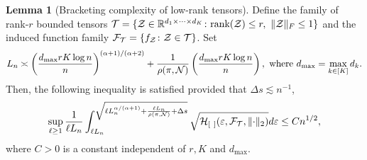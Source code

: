 \documentclass[twoside,11pt]{article}
\theoremstyle{definition}
\newtheorem{lem}{Lemma}
\def\rank{\textup{rank}}
\begin{document}
\begin{lem}[Bracketing complexity of low-rank tensors] \label{lem:metric}
Define the family of rank-$r$ bounded tensors $\tT=\{\tZ\in\mathbb{R}^{d_1\times \cdots \times d_K}\colon \rank(\tZ)\leq r, \ \FnormSize{}{\tZ}\leq 1\}$ and the induced function family $\mathcal{F}_{\mathcal{T}} = \{f_{\mathcal{Z}}\colon \mathcal{Z}\in\mathcal{T}\}$.  Set 
\begin{equation}\label{eq:specification}
L_n\asymp \left({d_{\max}rK\log n \over n } \right)^{(\alpha+1)/(\alpha+2)} + {1\over \rho (\pi, \mathcal{N})}\left({d_{\max}rK\log n \over n } \right),  \text{ where } d_{\max}  = \max_{k\in[K]}d_k.
\end{equation}
 Then, the following inequality is satisfied provided that $\Delta s \lesssim n^{-1}$,
\begin{equation}\label{eq:L}
\sup_{\ell\geq 1}{1\over \ell L_n}\int^{\sqrt{\ell L_n^{\alpha/(\alpha+1)}+{\ell L_n\over \rho (\pi, \mathcal{N})}+\Delta s}}_{\ell L_n} \sqrt{\mathcal{H}_{[\ ]}(\varepsilon, \mathcal{F}_{\mathcal{T}} ,\lVert\cdot\rVert_2) }d\varepsilon \leq Cn^{1/2},
\end{equation}
where $C>0$ is a constant independent of $r,K$  and $d_{\text{max}}$.
\end{lem}
\end{document}
